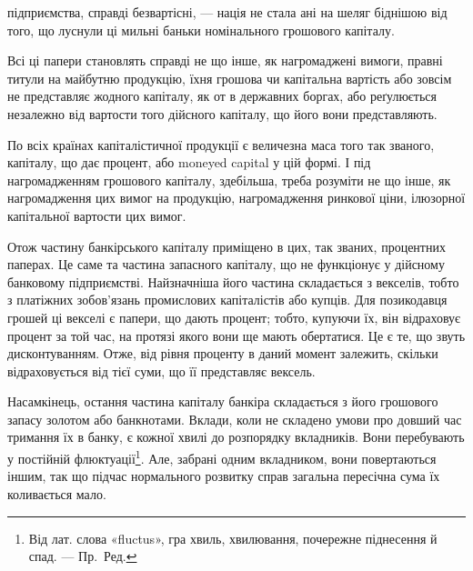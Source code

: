 \parcont{}  %
підприємства, справді безвартісні, — нація не стала ані на шеляг біднішою
від того, що луснули ці мильні баньки номінального грошового капіталу.

Всі ці папери становлять справді не що інше, як нагромаджені вимоги,
правні титули на майбутню продукцію, їхня грошова чи капітальна вартість
або зовсім не представляє жодного капіталу, як от в державних боргах, або
реґулюється незалежно від вартости того дійсного капіталу, що його вони представляють.

По всіх країнах капіталістичної продукції є величезна маса того так званого,
капіталу, що дає процент, або moneyed capital у цій формі. І під нагромадженням
грошового капіталу, здебільша, треба розуміти не що інше, як нагромадження
цих вимог на продукцію, нагромадження ринкової ціни, ілюзорної
капітальної вартости цих вимог.

Отож частину банкірського капіталу приміщено в цих, так званих, процентних
паперах. Це саме та частина запасного капіталу, що не функціонує
у дійсному банковому підприємстві. Найзначніша його частина складається з
векселів, тобто з платіжних зобов’язань промислових капіталістів або купців.
Для позикодавця грошей ці векселі є папери, що дають процент; тобто, купуючи
їх, він відраховує процент за той час, на протязі якого вони ще мають обертатися.
Це є те, що звуть дисконтуванням. Отже, від рівня проценту в даний момент
залежить, скільки відраховується від тієї суми, що її представляє вексель.

Насамкінець, остання частина капіталу банкіра складається з його грошового
запасу золотом або банкнотами. Вклади, коли не складено умови про
довший час тримання їх в банку, є кожної хвилі до розпорядку вкладників.
Вони перебувають у постійній флюктуації\footnote*{
Від лат. слова «fluctus», гра хвиль, хвилювання, почережне піднесення й спад. — Пр.~Ред.
}. Але, забрані одним вкладником, вони
повертаються іншим, так що підчас нормального розвитку справ загальна пересічна
сума їх коливається мало.

